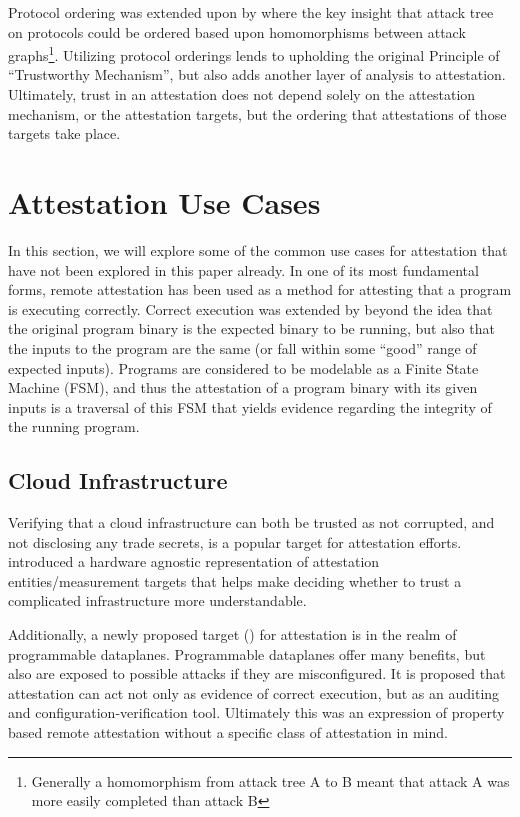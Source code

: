 \documentclass[acmsmall]{acmart}
\theoremstyle{definition}
\begin{document}
Protocol ordering was extended upon by \citet{rowe2021orderings,Rowe:2016wb} where
the key insight that attack tree on protocols could be ordered
based upon homomorphisms between attack graphs\footnote{Generally a homomorphism from attack tree A to B meant that attack A was more easily completed than attack B}.
Utilizing protocol orderings lends to upholding the original Principle of ``Trustworthy Mechanism'', but also adds another layer of analysis to attestation.
Ultimately, trust in an attestation does not depend solely on the attestation
mechanism, or the attestation targets, but the ordering that attestations
of those targets take place.

\section{Attestation Use Cases}

In this section, we will explore some of the common use cases for attestation 
that have not been explored in this paper already.
In one of its most fundamental forms, remote attestation has been used as a method for attesting that a program is executing correctly.
Correct execution was extended by \citet{Gu:2008:Remote-Attestation-on-Program-Execution} beyond the idea that the original program binary is the expected binary to be running, but also that the inputs to the program are the same (or fall within some ``good'' range of expected inputs). Programs are considered to be modelable as a Finite State Machine (FSM), and thus the attestation of a program binary with its given inputs is a traversal of this FSM that yields evidence regarding the integrity of the running program. 

\subsection{Cloud Infrastructure}

Verifying that a cloud infrastructure can both be trusted 
as not corrupted, and not disclosing any trade secrets, is a 
popular target for attestation efforts.
\citet{Ott:2023:Universal-Remote-Attestation-Cloud-Platforms} introduced
a hardware agnostic representation of attestation entities/measurement targets that helps make deciding whether to trust a complicated infrastructure more understandable.

Additionally, a newly proposed target (\citet{sultanasy22acase}) for attestation is in the realm of programmable dataplanes.
Programmable dataplanes offer many benefits, but also are exposed to possible attacks if they are misconfigured. It is proposed that attestation can act not only as evidence of correct execution, but as an auditing and configuration-verification tool. Ultimately this was an expression of property based remote attestation without a specific class of attestation in mind.
\end{document}
